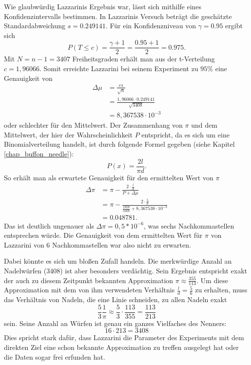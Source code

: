 \documentclass[10pt,twocolumn]{scrartcl}
\begin{document}
	Wie glaubwürdig Lazzarinis Ergebnis war, lässt sich mithilfe eines Konfidenzintervalls bestimmen.
	In Lazzarinis Versuch beträgt die geschätzte Standardabweichung $s = 0.249141$.
	Für ein Konfidenzniveau von $\gamma = 0.95$ ergibt sich
	\begin{equation}
	P(T \le c) = \frac{\gamma + 1}{2} = \frac{0.95 + 1}{2} = 0.975 .
	\end{equation}
	Mit $N = n - 1 = 3407$ Freiheitsgraden erhält man aus der t-Verteilung $c = 1,96066$.
	Somit erreichte Lazzarini bei seinem Experiment zu $95\%$ eine Genauigkeit von
	\begin{align}
	\Delta \mu &= \frac{cs}{\sqrt{n}} \\
	&= \frac{1,96066 \cdot 0.249141}{\sqrt{3408}} \\ \nonumber
	&= 8,367538 \cdot 10 ^{-3} \nonumber
	\end{align}
	oder schlechter für den Mittelwert. Der Zusammenhang von $\pi$ und dem Mittelwert, der hier der Wahrscheinlichkeit $P$ entspricht, da es sich um eine Binomialverteilung handelt, ist durch folgende Formel gegeben (siehe Kapitel \ref{chap_buffon_needle}):
	\begin{equation}
	P(x) = \frac{2l}{\pi d}.
	\end{equation}
	So erhält man als erwartete Genauigkeit für den ermittelten Wert von $\pi$
	\begin{align}
	\Delta \pi &= \pi - \frac{2 \cdot \frac{l}{d}}{P + \Delta \mu} \\
	&= \pi - \frac{2 \cdot \frac{5}{6}}{\frac{1808}{3408} + 8,367538 \cdot 10 ^{-3}} \\ \nonumber
	&= 0.048781 \nonumber .
	\end{align}
	Das ist deutlich ungenauer als $\Delta \pi = 0,5 * 10^{-6}$, was sechs Nachkommastellen entsprechen würde.
	Die Genauigkeit von dem ermittelten Wert für $\pi$ von Lazzarini von 6 Nachkommastellen war also nicht zu erwarten.
	
	Dabei könnte es sich um bloßen Zufall handeln. Die merkwürdige Anzahl an Nadelwürfen ($3408$) ist aber besonders verdächtig. Sein Ergebnis entspricht exakt der auch zu diesem Zeitpunkt bekannten Approximation $\pi \approx \frac{355}{113}$.
	Um diese Approximation mit dem von ihm verwendeten Verhältnis ${\tfrac {l}{d}={\tfrac {5}{6}}}$ zu erhalten, muss das Verhältnis von Nadeln, die eine Linie schneiden, zu allen Nadeln exakt
	\begin{equation}
	\frac{5}{3} \frac{1}{\pi}  \approx \frac{5}{3} \cdot \frac{113}{355} = \frac{113}{213}
	\end{equation}
	sein.
	Seine Anzahl an Würfen ist genau ein ganzes Vielfaches des Nenners:
	\begin{equation}
	16 \cdot 213 = 3408
	\end{equation}
	Dies spricht stark dafür, dass Lazzarini die Parameter des Experiments mit dem direkten Ziel eine schon bekannte Approximation zu treffen ausgelegt hat oder die Daten sogar frei erfunden hat. \cite{Badger}
	
\end{document}
